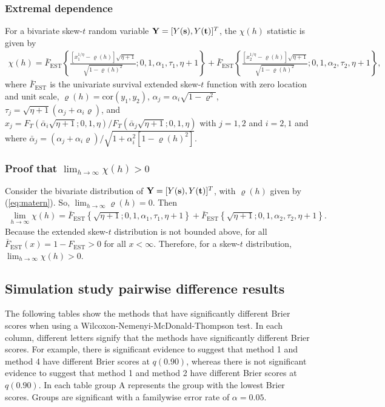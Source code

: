 \documentclass[11pt]{article}
\begin{document}
\subsubsection*{Extremal dependence}
For a bivariate skew-$t$ random variable $\mbox{\bf Y} = [Y(\mbox{\bf s}), Y(\mbox{\bf t})]^T$, the $\chi(h)$ statistic \citep{Padoan2011} is given by
\begin{align} \label{eq:chiskew-t}
  \chi(h) = \bar{F}_{\text{EST}}\left\{ \frac{[x_1^{1 / \eta} - \varrho(h)] \sqrt{\eta + 1} }{\sqrt{1 - \varrho(h)^2}}; 0, 1, \alpha_1, \tau_1, \eta + 1 \right\} + \bar{F}_{\text{EST}}\left\{ \frac{ [x_2^{1 / \eta} - \varrho(h)] \sqrt{\eta + 1} }{ \sqrt{1 - \varrho(h)^2} }; 0, 1, \alpha_2, \tau_2, \eta + 1 \right\},
\end{align}
where $\bar{F}_{\text{EST}}$ is the univariate survival extended skew-$t$ function with zero location and unit scale, \hbox{$\varrho(h) = \text{cor}(y_1, y_2)$}, $\alpha_j = \alpha_i \sqrt{1 - \varrho^2}$, $\tau_j = \sqrt{\eta + 1}(\alpha_j + \alpha_i \varrho)$, and $x_j = F_T(\bar{\alpha}_i \sqrt{\eta + 1}; 0, 1, \eta) / F_T(\bar{\alpha}_j \sqrt{\eta + 1}; 0, 1, \eta)$ with $j = 1, 2$ and $i = 2, 1$ and where $\bar{\alpha}_j = (\alpha_j + \alpha_i \varrho) / \sqrt{ 1 + \alpha_i^2 [1 - \varrho(h)^2]}$.

\subsubsection*{Proof that $\lim_{h \rightarrow \infty} \chi(h) > 0$}
Consider the bivariate distribution of $\mbox{\bf Y} = [Y(\mbox{\bf s}), Y(\mbox{\bf t})]^T$, with $\varrho(h)$ given by (\ref{eq:matern}).
So, $\lim_{h \rightarrow \infty} \varrho(h) = 0$.
Then
\begin{align}
  \lim_{h \rightarrow \infty} \chi(h) = \bar{F}_{\text{EST}}\left\{ \sqrt{\eta + 1}; 0, 1, \alpha_1, \tau_1, \eta + 1 \right\} + \bar{F}_{\text{EST}}\left\{ \sqrt{\eta + 1}; 0, 1, \alpha_2, \tau_2, \eta + 1 \right\}.
\end{align}
Because the extended skew-$t$ distribution is not bounded above, for all $\bar{F}_{\text{EST}}(x) = 1 - F_{\text{EST}} > 0$ for all $x < \infty$.
Therefore, for a skew-$t$ distribution, $\lim_{h \rightarrow \infty} \chi(h) > 0$.

\subsection{Simulation study pairwise difference results} \label{a:pdiffs}
The following tables show the methods that have significantly different Brier scores when using a Wilcoxon-Nemenyi-McDonald-Thompson test.
In each column, different letters signify that the methods have significantly different Brier scores.
For example, there is significant evidence to suggest that method 1 and method 4 have different Brier scores at $q(0.90)$, whereas there is not significant evidence to suggest that method 1 and method 2 have different Brier scores at $q(0.90)$.
In each table group A represents the group with the lowest Brier scores.
Groups are significant with a familywise error rate of $\alpha = 0.05$.
\end{document}
